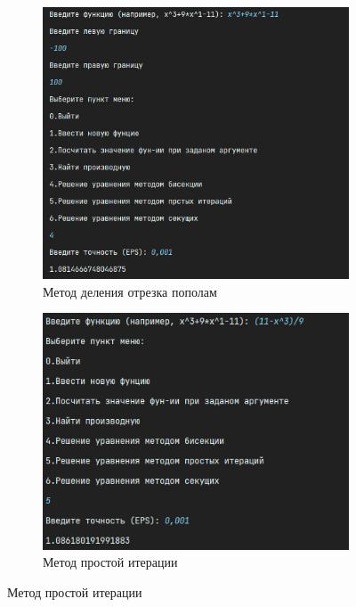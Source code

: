 \documentclass[12pt]{article}
\begin{document}
\begin{figure}[p]
  \centering
  \begin{subfigure}[p]{0.4\textwidth}
    \centering
    \includegraphics[width=\textwidth]{bisection_method.png}
    \caption{Метод деления отрезка пополам}
  \end{subfigure}
  \hfill
  \begin{subfigure}[p]{0.4\textwidth}
    \centering
    \includegraphics[width=\textwidth]{simple_iteration_method.png}
    \caption{Метод простой итерации}
  \end{subfigure}

\end{figure}
\end{document}
